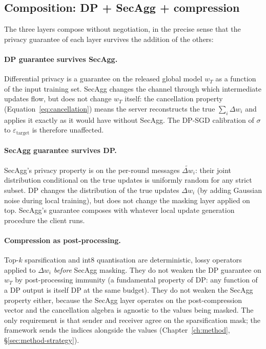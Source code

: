 \documentclass[11pt,a4paper]{report}
\begin{document}
\subsection{Composition: DP + SecAgg + compression}\label{sec:composition}

The three layers compose without negotiation, in the precise sense that
the privacy guarantee of each layer survives the addition of the others:

\paragraph{DP guarantee survives SecAgg.} Differential privacy is a
guarantee on the released global model $w_T$ as a function of the input
training set. SecAgg changes the channel through which intermediate
updates flow, but does not change $w_T$ itself: the cancellation property
(Equation~\ref{eq:cancellation}) means the server reconstructs the true
$\sum_i \Delta w_i$ and applies it exactly as it would have without
SecAgg. The DP-SGD calibration of $\sigma$ to $\varepsilon_{\mathrm{target}}$
is therefore unaffected.

\paragraph{SecAgg guarantee survives DP.} SecAgg's privacy property is on
the per-round messages $\tilde{\Delta w}_i$: their joint distribution
conditional on the true updates is uniformly random for any strict
subset. DP changes the distribution of the true updates $\Delta w_i$ (by
adding Gaussian noise during local training), but does not change the
masking layer applied on top. SecAgg's guarantee composes with whatever
local update generation procedure the client runs.

\paragraph{Compression as post-processing.} Top-$k$ sparsification and
int8 quantisation are deterministic, lossy operators applied to
$\Delta w_i$ \emph{before} SecAgg masking. They do not weaken the DP
guarantee on $w_T$ by post-processing immunity (a fundamental property
of DP: any function of a DP output is itself DP at the same budget).
They do not weaken the SecAgg property either, because the SecAgg layer
operates on the post-compression vector and the cancellation algebra is
agnostic to the values being masked. The only requirement is that
sender and receiver agree on the sparsification mask; the framework
sends the indices alongside the values
(Chapter~\ref{ch:method}, \S\ref{sec:method-strategy}).
\end{document}
